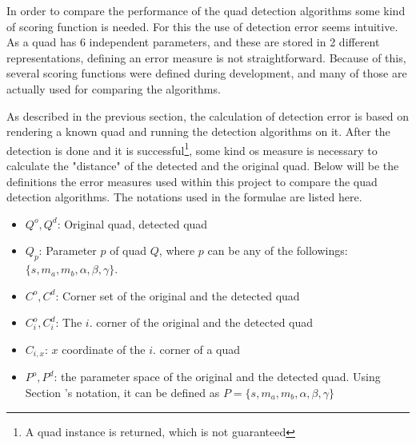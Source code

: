 In order to compare the performance of the quad detection algorithms some kind of scoring function is needed.
For this the use of detection error seems intuitive.
As a quad has 6 independent parameters, and these are stored in 2 different representations, defining an error measure is not straightforward.
Because of this, several scoring functions were defined during development, and many of those are actually used for comparing the algorithms.

As described in the previous section, the calculation of detection error is based on rendering a known quad and running the detection algorithms on it.
After the detection is done and it is successful\footnote{A quad instance is returned, which is not guaranteed}, some kind os measure is necessary to calculate the "distance" of the detected and the original quad.
Below will be the definitions the error measures used within this project to compare the quad detection algorithms.
The notations used in the formulae are listed here.
\begin{itemize}
	\item $Q^o, Q^d$: Original quad, detected quad
	\item $Q_p$: Parameter $p$ of quad $Q$, where $p$ can be any of the followings: $\{s, m_a, m_b, \alpha, \beta, \gamma\}$. 
	\item $C^o, C^d$: Corner set of the original and the detected quad
	\item $C_i^o, C_i^d$: The $i.$ corner of the original and the detected quad
	\item $C_{i,x}$: $x$ coordinate of the $i.$ corner of a quad
	\item $P^o, P^d$: the parameter space of the original and the detected quad. Using Section 's notation, it can be defined as $P = \{s, m_a, m_b, \alpha, \beta, \gamma\}$
\end{itemize}

